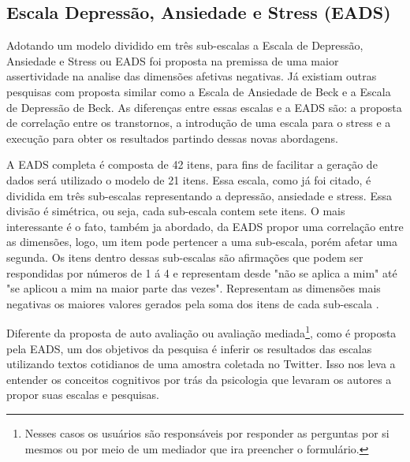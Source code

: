 \subsection{Escala Depressão, Ansiedade e Stress (EADS)}
Adotando um modelo dividido em três sub-escalas a Escala de Depressão, Ansiedade e Stress ou EADS foi proposta na premissa de uma maior assertividade na analise das dimensões afetivas negativas. Já existiam outras pesquisas com proposta similar como a Escala de Ansiedade de Beck e a Escala de Depressão de Beck. As diferenças entre essas escalas e a EADS são: a proposta de correlação entre os transtornos, a introdução de uma escala para o stress e a execução para obter os resultados partindo dessas novas abordagens.

A EADS completa é composta de 42 itens, para fins de facilitar a geração de dados será utilizado o modelo de 21 itens. Essa escala, como já foi citado, é dividida em três sub-escalas representando a depressão, ansiedade e stress. Essa divisão é simétrica, ou seja, cada sub-escala contem sete itens. O mais interessante é o fato, também ja abordado, da EADS propor uma correlação entre as dimensões, logo, um item pode pertencer a uma sub-escala, porém afetar uma segunda. Os itens dentro dessas sub-escalas são afirmações que podem ser respondidas por números de 1 á 4 e representam desde "não se aplica a mim" até "se aplicou a mim na maior parte das vezes". Representam as dimensões mais negativas os maiores valores gerados pela soma dos itens de cada sub-escala \cite{lovibond1995structure, ribeiro2004contribuiccao}.

Diferente da proposta de auto avaliação ou avaliação mediada\footnote{Nesses casos os usuários são responsáveis por responder as perguntas por si mesmos ou por meio de um mediador que ira preencher o formulário.}, como é proposta pela EADS,  um dos objetivos da pesquisa é inferir os resultados das escalas utilizando textos cotidianos de uma amostra coletada no Twitter. Isso nos leva a entender os conceitos cognitivos por trás da psicologia que levaram os autores a propor suas escalas e pesquisas.
